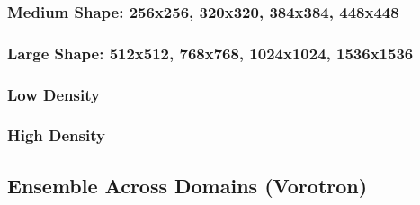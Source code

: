 \documentclass[format=acmsmall,screen,review,authordraft,nonacm]{acmart}
\newcommand{\ourjfa}{Vorotron} %
\begin{document}


\subsubsection{Medium Shape: 256x256, 320x320, 384x384, 448x448}
\subsubsection{Large Shape: 512x512, 768x768, 1024x1024, 1536x1536}

\subsubsection{Low Density}
\subsubsection{High Density}



\subsection{Ensemble Across Domains (\ourjfa)} %
\end{document}
